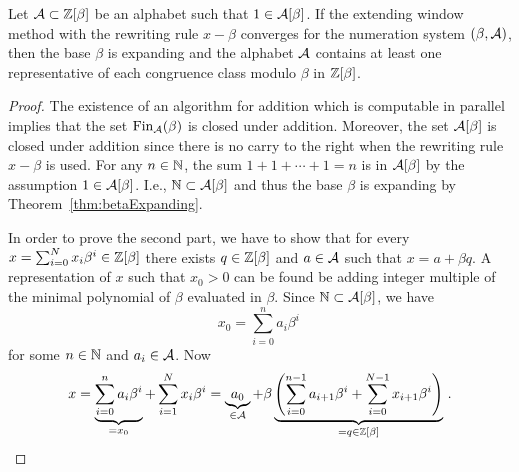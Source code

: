 \begin{theo}
Let $\mathcal{A}\subset \mathbb{Z}[\beta]$ be an alphabet such that $1\in \mathcal{A}[\beta]$. If the extending window method with the rewriting rule $x-\beta$ converges for the numeration system $(\beta, \mathcal{A})$, then the base $\beta$ is expanding and the alphabet $\mathcal{A}$ contains at least one representative of each congruence class modulo $\beta$ in $\mathbb{Z}[\beta]$. 
\end{theo}
\begin{proof}
The existence of an algorithm for addition which is computable in parallel implies that the set $\text{Fin}_{\mathcal{A}}(\beta)$ is closed under addition. Moreover, the set $\mathcal{A}[\beta]$ is closed under addition since there is no carry to the right when the rewriting rule $x-\beta$ is used. For any $n\in\mathbb{N}$, the sum $1+1+\cdots +1=n$ is in $\mathcal{A}[\beta]$ by the assumption $1\in \mathcal{A}[\beta]$. I.e., $\mathbb{N}\subset \mathcal{A}[\beta]$ and thus the base $\beta$ is expanding by Theorem~\ref{thm:betaExpanding}.

In order to prove the second part, we have to show that for every $x=\sum_{i=0}^N x_i \beta^i \in\mathbb{Z}[\beta]$ there exists $q\in\mathbb{Z}[\beta]$ and $a\in\mathcal{A}$ such that $x=a+\beta q$. A representation of $x$ such that $x_0> 0$ can be found be adding integer multiple of the minimal polynomial of $\beta$ evaluated in $\beta$. Since $\mathbb{N}\subset \mathcal{A}[\beta]$, we have
$$
x_0=\sum_{i=0}^{n}a_i\beta^i\,
    $$
    for some $n\in\mathbb{N}$ and $a_i\in\mathcal{A}$. Now
    $$
    x=\underbrace{\sum_{i=0}^{n}a_i\beta^i}_{=x_0} + \sum_{i=1}^N x_i \beta^i=\underbrace{a_0}_{\in\mathcal{A}} + \beta \underbrace{\left(\sum_{i=0}^{n-1}a_{i+1}\beta^i + \sum_{i=0}^{N-1} x_{i+1} \beta^i\right)}_{=q\in\mathbb{Z}[\beta]}\,.
    $$
\end{proof}
